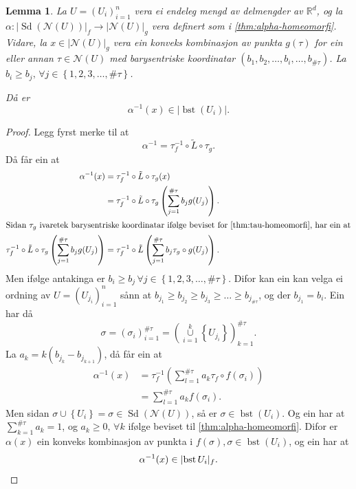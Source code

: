 \documentclass[a4paper, 12pt, norsk]{article}
\theoremstyle{plain}
\newtheorem{lemma}[theorem]{Lemma}
\theoremstyle{definition}
\newcommand{\Rb}{\mathbb{R}}
\newcommand{\Nc}{\mathcal{N}}
\newcommand{\union}{ \mathop{\cup}\limits }
\newcommand{\gr}[1]{ \lvert #1 \rvert } %
\newcommand{\set}[1]{ \left\{ #1 \right\} } %
\newcommand{\tuple}[1]{ \left( #1 \right) } %
\DeclareMathOperator{\Sd}{Sd} %
\DeclareMathOperator{\bst}{bst} %
\begin{document}
\begin{lemma} \label{thm:bst-betingingar}
	La \( U = \tuple{U_i}_{i=1}^n \) vera ei endeleg mengd av delmengder av \( \Rb^d \), og la \( \alpha: \gr{\Sd(\Nc(U))}_f \to \gr{\Nc(U)}_g \) vera definert som i \autoref{thm:alpha-homeomorfi}. Vidare, la \( x \in \gr{\Nc(U)}_g \) vera ein konveks kombinasjon av punkta \( g(\tau) \) for ein eller annan \( \tau \in \Nc(U) \) med barysentriske koordinatar \( \tuple{b_1, b_2,\dots, b_i, \dots, b_{\#\tau}} \). La \( b_i \geq b_j, \, \forall j \in \set{1, 2, 3, \dots, \#\tau} \). 
	
	Då er
	\[ 
		\alpha^{-1}(x) \in \gr{\bst(U_i)}.
	\]
\end{lemma}

\begin{proof}
	Legg fyrst merke til at
	\[
		\alpha^{-1} = \tau_f^{-1} \circ \tilde{L} \circ \tau_g.
	\]
	Då får ein at
	\begin{align*}
		\alpha^{-1}(x) &= \tau_f^{-1} \circ \tilde{L} \circ \tau_g (x) \\
		&= \tau_f^{-1} \circ \tilde{L} \circ \tau_g \tuple{\sum_{j=1}^{\#\tau} b_j g(U_j)}. \\
		\intertext{Sidan \( \tau_g \) ivaretek barysentriske koordinatar ifølge beviset for \autoref{thm:tau-homeomorfi}, har ein at}
		\tau_f^{-1} \circ \tilde{L} \circ \tau_g \tuple{\sum_{j=1}^{\#\tau} b_j g(U_j)} &= \tau_f^{-1} \circ \tilde{L} \tuple{\sum_{j=1}^{\#\tau} b_j \tau_g \circ g(U_j)}.
	\end{align*}
	Men ifølge antakinga er \( b_i \geq b_j \, \forall j \in \set{1, 2, 3, \dots, \#\tau} \). Difor kan ein kan velga ei ordning av \( U = \tuple{U_{j_i}}_{i=1}^n \) sånn at \( b_{j_1} \geq b_{j_2} \geq b_{j_3} \geq \dots \geq b_{j_{\#\tau}} \), og der \( b_{j_1}=b_i \). Ein har då 
	\[
		\sigma = \tuple{\sigma_i}_{i=1}^{\#\tau} = \tuple{\union_{i=1}^k \set{U_{j_i}}}_{k=1}^{\#\tau}.
	\]
	La \( a_k = k\tuple{b_{j_k}-b_{j_{k+1}}} \), då får ein at
	\begin{align*}
		\alpha^{-1}(x) &= \tau_f^{-1} \tuple{\sum_{l=1}^{\#\tau}a_k \tau_f \circ f(\sigma_i)} \\
		&= \sum_{l=1}^{\#\tau} a_k f(\sigma_i).
	\end{align*}
	Men sidan \( \sigma \union \set{U_i} = \sigma \in \Sd(\Nc(U)) \), så er \( \sigma \in \bst(U_i) \). Og ein har at \( \sum_{k=1}^{\#\tau} a_k = 1 \), og \( a_k \geq 0, \, \forall k \) ifølge beviset til \autoref{thm:alpha-homeomorfi}. Difor er \( \alpha(x) \) ein konveks kombinasjon av punkta i \( f(\sigma), \sigma \in \bst(U_i) \), og ein har at
	\[
		\alpha^{-1}(x) \in \gr{\bst{U_i}}_f. \qedhere
	\]
\end{proof}
\end{document}
